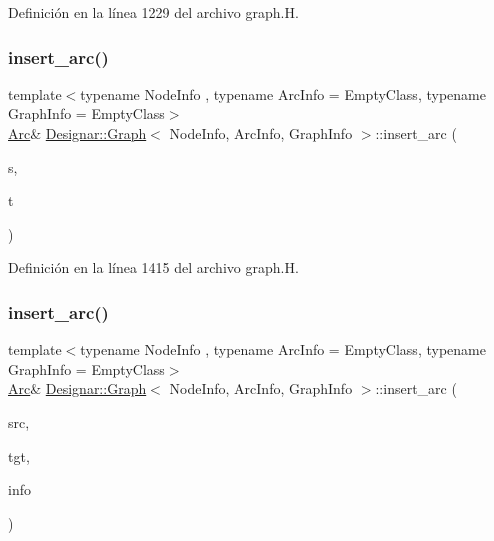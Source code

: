 Definición en la línea 1229 del archivo graph.\+H.

\mbox{\label{class_designar_1_1_graph_a794e687e21db6f4e00e14c6bdc5c2907}} 
\subsubsection{\texorpdfstring{insert\+\_\+arc()}{insert\_arc()}\hspace{0.1cm}{\footnotesize\ttfamily [2/4]}}
{\footnotesize\ttfamily template$<$typename Node\+Info , typename Arc\+Info  = Empty\+Class, typename Graph\+Info  = Empty\+Class$>$ \\
\hyperlink{class_designar_1_1_graph_a74c730ef4ce2d20f998d72bd25c2b5bf}{Arc}\& \hyperlink{class_designar_1_1_graph}{Designar\+::\+Graph}$<$ Node\+Info, Arc\+Info, Graph\+Info $>$\+::insert\+\_\+arc (\begin{DoxyParamCaption}\item[{\hyperlink{class_designar_1_1_graph_a5dfc7dba9d092ac489c72e40390c37d0}{Node} \&}]{s,  }\item[{\hyperlink{class_designar_1_1_graph_a5dfc7dba9d092ac489c72e40390c37d0}{Node} \&}]{t }\end{DoxyParamCaption})\hspace{0.3cm}{\ttfamily [inline]}}



Definición en la línea 1415 del archivo graph.\+H.

\mbox{\label{class_designar_1_1_graph_ad310a106f10d0a7ff12915d8b47e8e3d}} 
\subsubsection{\texorpdfstring{insert\+\_\+arc()}{insert\_arc()}\hspace{0.1cm}{\footnotesize\ttfamily [3/4]}}
{\footnotesize\ttfamily template$<$typename Node\+Info , typename Arc\+Info  = Empty\+Class, typename Graph\+Info  = Empty\+Class$>$ \\
\hyperlink{class_designar_1_1_graph_a74c730ef4ce2d20f998d72bd25c2b5bf}{Arc}\& \hyperlink{class_designar_1_1_graph}{Designar\+::\+Graph}$<$ Node\+Info, Arc\+Info, Graph\+Info $>$\+::insert\+\_\+arc (\begin{DoxyParamCaption}\item[{\hyperlink{class_designar_1_1_graph_a5dfc7dba9d092ac489c72e40390c37d0}{Node} \&}]{src,  }\item[{\hyperlink{class_designar_1_1_graph_a5dfc7dba9d092ac489c72e40390c37d0}{Node} \&}]{tgt,  }\item[{const Arc\+Info \&}]{info }\end{DoxyParamCaption})\hspace{0.3cm}{\ttfamily [inline]}}



